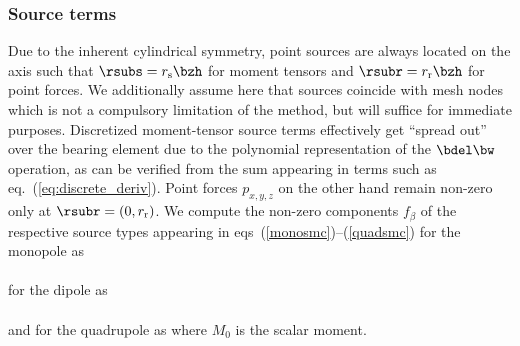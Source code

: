 \subsubsection{Source terms}\label{section:source}
%
Due to the inherent cylindrical symmetry, point sources are always located 
on the axis such that $\rsubs=r_{\rm s} \bzh$ for moment tensors and 
$\rsubr=r_{\rm r} \bzh$ for point forces. 
We additionally assume here that sources coincide with mesh nodes which 
is not a compulsory limitation of the method, but will suffice for immediate 
purposes. Discretized moment-tensor source terms effectively get 
``spread out'' over the bearing element due to the polynomial representation of
the $\bdel \bw$ operation, as can be verified from the sum appearing in terms 
such as eq.~(\ref{eq:discrete_deriv}).
Point forces $p_{x,y,z}$ on the other hand remain non-zero only at 
$\rsubr=(0,r_{\rm r})$. 
%
We compute the non-zero components $f_\beta$ of the respective source types 
appearing in eqs~(\ref{monosmc})--(\ref{quadsmc}) for the monopole as
%
\eqa \label{eq:src_mo}
 \vspace*{0.2cm}\\
\vspace*{0.2cm}\\
\ena
%
for the dipole as
%
\eqa \label{eq:src_di}
 \vspace*{0.2cm}\\
\vspace*{0.2cm}\\
\ena
%
and for the quadrupole as
%
\eqa \label{eq:src_qu}
\ena
%
where $M_0$ is the scalar moment.

